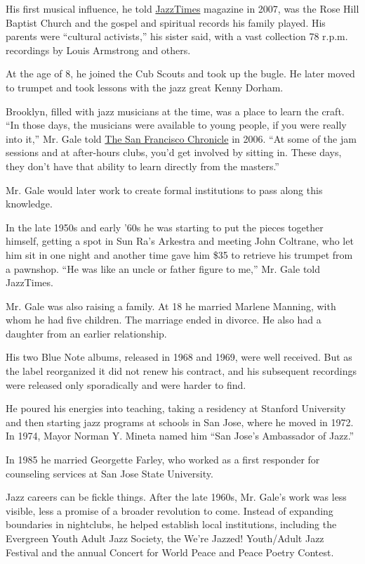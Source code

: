His first musical influence, he told
\href{https://jazztimes.com/features/profiles/eddie-gale-overdue-ovation/}{JazzTimes}
magazine in 2007, was the Rose Hill Baptist Church and the gospel and
spiritual records his family played. His parents were ``cultural
activists,'' his sister said, with a vast collection 78 r.p.m.
recordings by Louis Armstrong and others.

At the age of 8, he joined the Cub Scouts and took up the bugle. He
later moved to trumpet and took lessons with the jazz great Kenny
Dorham.

Brooklyn, filled with jazz musicians at the time, was a place to learn
the craft. ``In those days, the musicians were available to young
people, if you were really into it,'' Mr. Gale told
\href{https://www.sfgate.com/living/article/JEFFERSON-AWARD-Presented-to-Eddie-Gale-Gale-2487432.php}{The
San Francisco Chronicle} in 2006. ``At some of the jam sessions and at
after-hours clubs, you'd get involved by sitting in. These days, they
don't have that ability to learn directly from the masters.''

Mr. Gale would later work to create formal institutions to pass along
this knowledge.

In the late 1950s and early '60s he was starting to put the pieces
together himself, getting a spot in Sun Ra's Arkestra and meeting John
Coltrane, who let him sit in one night and another time gave him \$35 to
retrieve his trumpet from a pawnshop. ``He was like an uncle or father
figure to me,'' Mr. Gale told JazzTimes.

Mr. Gale was also raising a family. At 18 he married Marlene Manning,
with whom he had five children. The marriage ended in divorce. He also
had a daughter from an earlier relationship.

His two Blue Note albums, released in 1968 and 1969, were well received.
But as the label reorganized it did not renew his contract, and his
subsequent recordings were released only sporadically and were harder to
find.

He poured his energies into teaching, taking a residency at Stanford
University and then starting jazz programs at schools in San Jose, where
he moved in 1972. In 1974, Mayor Norman Y. Mineta named him ``San Jose's
Ambassador of Jazz.''

In 1985 he married Georgette Farley, who worked as a first responder for
counseling services at San Jose State University.

Jazz careers can be fickle things. After the late 1960s, Mr. Gale's work
was less visible, less a promise of a broader revolution to come.
Instead of expanding boundaries in nightclubs, he helped establish local
institutions, including the Evergreen Youth Adult Jazz Society, the
We're Jazzed! Youth/Adult Jazz Festival and the annual Concert for World
Peace and Peace Poetry Contest.

